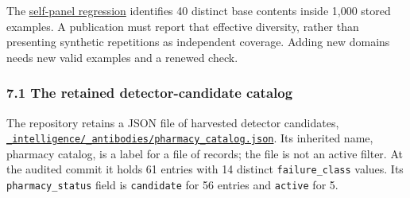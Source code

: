 \documentclass[
  11pt,
]{article}
\newcommand{\passthrough}[1]{#1}
\begin{document}
The
\href{https://github.com/dbccpage/the_symbol_game/blob/52cb5457f6c485ba548cfd292f6012a941ed22cf/symbol_game/tests/test_immune_defect_regressions.py}{self-panel
regression} identifies 40 distinct base contents inside 1,000 stored
examples. A publication must report that effective diversity, rather
than presenting synthetic repetitions as independent coverage. Adding
new domains needs new valid examples and a renewed check.

\hypertarget{the-retained-detector-candidate-catalog}{%
\subsubsection{7.1 The retained detector-candidate
catalog}\label{the-retained-detector-candidate-catalog}}

The repository retains a JSON file of harvested detector candidates,
\href{https://github.com/dbccpage/the_symbol_game/blob/52cb5457f6c485ba548cfd292f6012a941ed22cf/_intelligence/_antibodies/pharmacy_catalog.json}{\texttt{\nolinkurl{_intelligence/_antibodies/pharmacy_catalog.json}}}.
Its inherited name, pharmacy catalog, is a label for a file of records;
the file is not an active filter. At the audited commit it holds 61
entries with 14 distinct \texttt{\nolinkurl{failure_class}}
values. Its \texttt{\nolinkurl{pharmacy_status}} field is
\passthrough{\lstinline!candidate!} for 56 entries and
\passthrough{\lstinline!active!} for 5.
\end{document}
